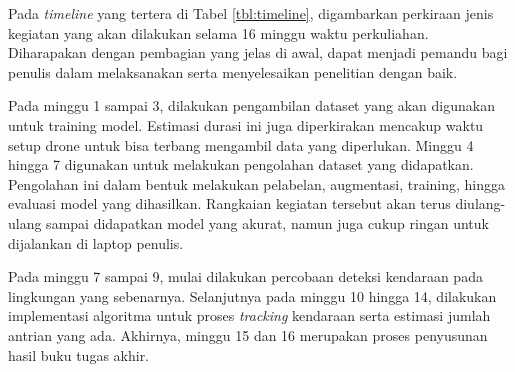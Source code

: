 Pada \emph{timeline} yang tertera di Tabel \ref{tbl:timeline}, digambarkan perkiraan jenis kegiatan yang akan dilakukan selama 16 minggu waktu perkuliahan. Diharapakan dengan pembagian yang jelas di awal, dapat menjadi pemandu bagi penulis dalam melaksanakan serta menyelesaikan penelitian dengan baik.

Pada minggu 1 sampai 3, dilakukan pengambilan dataset yang akan digunakan untuk training model. Estimasi durasi ini juga diperkirakan mencakup waktu setup drone untuk bisa terbang mengambil data yang diperlukan. Minggu 4 hingga 7 digunakan untuk melakukan pengolahan dataset yang didapatkan. Pengolahan ini dalam bentuk melakukan pelabelan, augmentasi, training, hingga evaluasi model yang dihasilkan. Rangkaian kegiatan tersebut akan terus diulang-ulang sampai didapatkan model yang akurat, namun juga cukup ringan untuk dijalankan di laptop penulis.

Pada minggu 7 sampai 9, mulai dilakukan percobaan deteksi kendaraan pada lingkungan yang sebenarnya. Selanjutnya pada minggu 10 hingga 14, dilakukan implementasi algoritma untuk proses \emph{tracking} kendaraan serta estimasi jumlah antrian yang ada. Akhirnya, minggu 15 dan 16 merupakan proses penyusunan hasil buku tugas akhir.